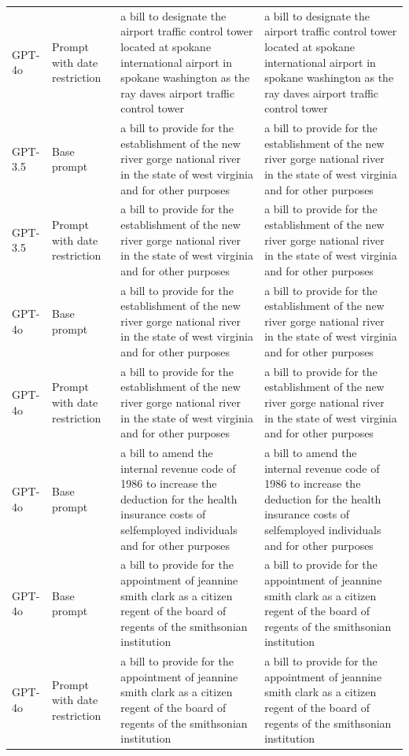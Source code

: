 \begin{longtable}{>{\raggedright\arraybackslash}p{1.4cm}>{\raggedright\arraybackslash}p{1.4cm}>{\raggedright\arraybackslash}p{5.5cm}>{\raggedright\arraybackslash}p{5.5cm}}
GPT-4o & Prompt with date restriction & a bill to designate the airport traffic control tower located at spokane international airport in spokane washington as the ray daves airport traffic control tower & a bill to designate the airport traffic control tower located at spokane international airport in spokane washington as the ray daves airport traffic control tower\\
GPT-3.5 & Base prompt & a bill to provide for the establishment of the new river gorge national river in the state of west virginia and for other purposes & a bill to provide for the establishment of the new river gorge national river in the state of west virginia and for other purposes\\
GPT-3.5 & Prompt with date restriction & a bill to provide for the establishment of the new river gorge national river in the state of west virginia and for other purposes & a bill to provide for the establishment of the new river gorge national river in the state of west virginia and for other purposes\\
GPT-4o & Base prompt & a bill to provide for the establishment of the new river gorge national river in the state of west virginia and for other purposes & a bill to provide for the establishment of the new river gorge national river in the state of west virginia and for other purposes\\
GPT-4o & Prompt with date restriction & a bill to provide for the establishment of the new river gorge national river in the state of west virginia and for other purposes & a bill to provide for the establishment of the new river gorge national river in the state of west virginia and for other purposes\\
GPT-4o & Base prompt & a bill to amend the internal revenue code of 1986 to increase the deduction for the health insurance costs of selfemployed individuals and for other purposes & a bill to amend the internal revenue code of 1986 to increase the deduction for the health insurance costs of selfemployed individuals and for other purposes\\
GPT-4o & Base prompt & a bill to provide for the appointment of jeannine smith clark as a citizen regent of the board of regents of the smithsonian institution & a bill to provide for the appointment of jeannine smith clark as a citizen regent of the board of regents of the smithsonian institution\\
GPT-4o & Prompt with date restriction & a bill to provide for the appointment of jeannine smith clark as a citizen regent of the board of regents of the smithsonian institution & a bill to provide for the appointment of jeannine smith clark as a citizen regent of the board of regents of the smithsonian institution\\

\end{longtable}
